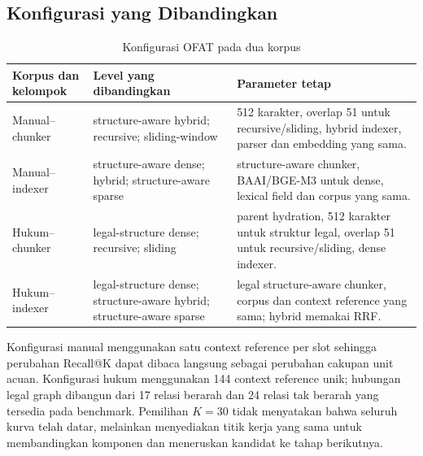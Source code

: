 \subsection{Konfigurasi yang Dibandingkan}

\begin{table}[t]
\centering
\caption{Konfigurasi OFAT pada dua korpus}
\label{tab:konfigurasi}
\scriptsize
\begin{tabularx}{\columnwidth}{@{}p{}p{}X@{}}
\toprule
\textbf{Korpus dan kelompok} & \textbf{Level yang dibandingkan} & \textbf{Parameter tetap}\\
\midrule
Manual--chunker & structure-aware hybrid; recursive; sliding-window & 512 karakter, overlap 51 untuk recursive/sliding, hybrid indexer, parser dan embedding yang sama.\\
Manual--indexer & structure-aware dense; hybrid; structure-aware sparse & structure-aware chunker, BAAI/BGE-M3 untuk dense, lexical field dan corpus yang sama.\\
Hukum--chunker & legal-structure dense; recursive; sliding & parent hydration, 512 karakter untuk struktur legal, overlap 51 untuk recursive/sliding, dense indexer.\\
Hukum--indexer & legal-structure dense; structure-aware hybrid; structure-aware sparse & legal structure-aware chunker, corpus dan context reference yang sama; hybrid memakai RRF.\\
\bottomrule
\end{tabularx}
\end{table}

Konfigurasi manual menggunakan satu context reference per slot sehingga perubahan Recall@K dapat dibaca langsung sebagai perubahan cakupan unit acuan. Konfigurasi hukum menggunakan 144 context reference unik; hubungan legal graph dibangun dari 17 relasi berarah dan 24 relasi tak berarah yang tersedia pada benchmark. Pemilihan $K=30$ tidak menyatakan bahwa seluruh kurva telah datar, melainkan menyediakan titik kerja yang sama untuk membandingkan komponen dan meneruskan kandidat ke tahap berikutnya.
